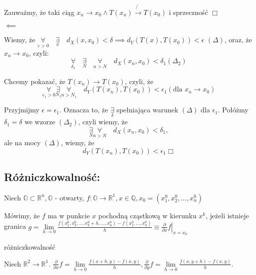\documentclass[../main.tex]{subfiles}
\begin{document}
Zauważmy, że taki ciąg $x_{n} \to x_{0} \land T(x_{n})\not{\to} T(x_{0})$ i sprzeczność $\Box$

\vspace{0.5cm}
\begin{large}
    $\impliedby$
\end{large}
\vspace{0.5cm}
Wiemy, że $\underset{\varepsilon > 0}{\forall}\quad \underset{x}{\exists}\quad d_{X} (x,x_{0}) < \delta \implies d_{Y} (T(x),T(x_{0})) < \epsilon$ $(\Delta)$, oraz, że $x_{n} \to x_{0}$, czyli:
\[
    \underset{\delta_1}{\forall} \quad\underset{N}{\exists} \quad\underset{n>N}{\forall} \quad d_{X} (x_{n}, x_{0}) < \delta_{1} (\Delta_2)
\]

Chcemy pokazać, że $T(x_n) \to T(x_0)$, czyli, że
$$\underset{\epsilon_1 > 0}{\forall} \underset{N_1}{\exists} \underset{n>N_1}{\forall} \quad d_Y (T(x_n),T(x_0)) < \epsilon_1 (\text{dla } x_n \to x_0)$$

Przyjmijmy $\epsilon=\epsilon_1$. Oznacza to, że $\underset{\delta}{\exists}$ spełniająca warunek $(\Delta)$ dla $\epsilon_1$. Połóżmy $\delta_1=\delta$ we wzorze $(\Delta_2)$, czyli wiemy, że
$$\underset{N}{\exists} \underset{n>N}{\forall} \quad d_X(x_n, x_0) < \delta_1,$$
ale na mocy $(\Delta)$, wiemy, że
$$d_Y (T(x_n),T(x_0)) < \epsilon_1 \Box$$

\subsection{
    Różniczkowalność:
}

Niech $\mathbb{O}\subset\mathbb{R}^{n}, \mathbb{O}$ - otwarty,
$f: \mathbb{O}\to\mathbb{R}^{1}, x\in\mathbb{Q}, x_0 = (x_1^0,x_2^0,\dots,x_n^0)$

Mówimy, że $f$ ma w punkcie $x$ pochodną cząstkową w kierunku $x^k$, jeżeli istnieje granica $g = \lim\limits_{h \to 0}\frac{f(x_1^0, x_2^0, \dots, x_k^0 + h, \dots, x_n^0) - f(x_1^0,\dots,x_n^0)}{h} \equiv \left. \frac{\partial}{\partial x} f \right |_{x=x_0}$

    \begin{przyklad}
        różniczkowalność
    \end{przyklad}

Niech $\mathbb{R}^{2}\to\mathbb{R}^{1}$. $\frac{\partial}{\partial x} f = \lim\limits_{h \to 0}\frac{f(x+h,y) - f(x,y)}{h}, \frac{\partial}{\partial y} f = \lim\limits_{h \to 0}\frac{f(x,y+h) - f(x,y)}{h}$.\\
\vspace{0.3cm}
\end{document}

